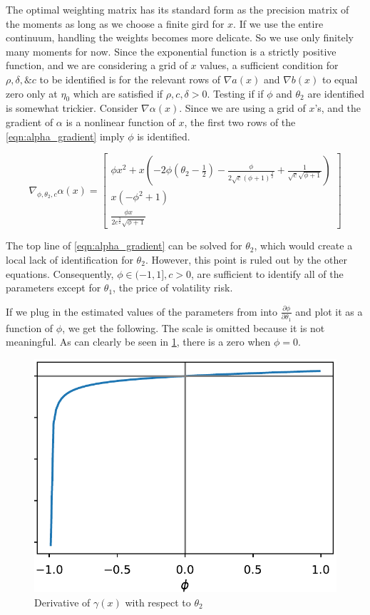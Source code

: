 \documentclass[11pt]{article}
\begin{document}
The optimal weighting matrix has its standard form as the precision matrix of the moments as long as we choose a
finite gird for $x$. 
If we use the entire continuum, handling the weights becomes more delicate. 
So we use only finitely many moments for now.
Since the exponential function is a strictly positive function, and we are considering a grid of $x$ values, a
sufficient condition for $\rho, \delta, \& c$ to be identified is for the relevant rows of $\nabla a(x)$ and
$\nabla b(x)$ to equal zero only at $\eta_0$ which are satisfied if $\rho, c, \delta > 0$.
Testing if if $\phi$ and $\theta_2$ are identified is somewhat trickier. 
Consider $\nabla \alpha(x)$. 
Since we are using a grid of $x$'s, and the gradient of $\alpha$ is a
nonlinear function of $x$, the first two rows of the \cref{eqn:alpha_gradient} imply $\phi$ is identified.

\begin{equation}
    \label{eqn:alpha_gradient}
    \nabla_{\phi, \theta_2, c}  \alpha(x) = \begin{bmatrix} \phi x^{2} + x \left(- 2 \phi \left(\theta_{2} -
    \frac{1}{2}\right) - \frac{\phi}{2 \sqrt{c} \left(\phi + 1\right)^{\frac{3}{2}}} + \frac{1}{\sqrt{c}
    \sqrt{\phi + 1}}\right) \\ x \left(- \phi^{2} + 1\right) \\ \frac{\phi x}{2 c^{\frac{3}{2}} \sqrt{\phi + 1}}
\end{bmatrix} 
\end{equation}

The top line of \cref{eqn:alpha_gradient} can be solved for $\theta_2$, which would create a local lack of
identification for $\theta_2$.
However, this point is ruled out by the other equations.
Consequently,  $\phi \in (-1,1], c > 0$, are sufficient to identify all of the parameters except for $\theta_1$,
the price of volatility risk.

If we plug in the estimated values of the parameters from \textcite{khrapov2016affine} into $\frac{\partial
\phi}{\partial \theta_1}$ and plot it as a function of $\phi$,  we get the following.
The scale is omitted because it is not meaningful. 
As can clearly be seen in \cref{fig:fig:gamma_diff_theta2}, there is a zero when $\phi = 0$.

\begin{figure}[htb]
    \centering
    \caption{Derivative of $\gamma(x)$ with respect to $\theta_2$}
    \label{fig:fig:gamma_diff_theta2}
    \includegraphics[width=.5\textwidth]{gamma_diff_theta2.pdf}
\end{figure}
\end{document}
